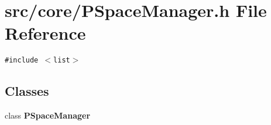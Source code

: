 \section{src/core/PSpace\-Manager.h File Reference}
\label{PSpaceManager_8h}


{\tt \#include $<$list$>$}\par
\subsection*{Classes}
\begin{CompactItemize}
\item 
class {\bf PSpace\-Manager}
\end{CompactItemize}
